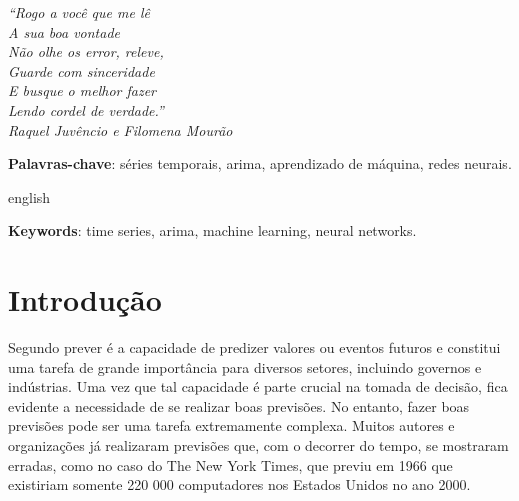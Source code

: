 \documentclass[
    12pt,
    oneside,
    a4paper,
    english,
    brazil
]{abntex2}
\begin{document}
\frenchspacing

\imprimircapa{}

\imprimirfolhaderosto{}

\begin{epigrafe}
    \vspace*{\fill}
    \begin{flushright}
        \textit{``Rogo a você que me lê\\
        A sua boa vontade\\
        Não olhe os error, releve,\\
        Guarde com sinceridade\\
        E busque o melhor fazer\\
        Lendo cordel de verdade.''\\
        Raquel Juvêncio e Filomena Mourão}
    \end{flushright}
\end{epigrafe}

\begin{resumo}

    \textbf{Palavras-chave}: séries temporais, arima, aprendizado de máquina,
    redes neurais.
\end{resumo}

\begin{resumo}[Abstract]
    \begin{otherlanguage*}{english}

        \textbf{Keywords}: time series, arima, machine learning, neural
        networks.
    \end{otherlanguage*}
\end{resumo}

\textual{}

\tableofcontents*
\cleardoublepage{}

\chapter{Introdução}


Segundo  prever é a capacidade de predizer valores ou eventos
futuros e  constitui uma  tarefa de grande  importância para  diversos setores,
incluindo governos e indústrias. Uma vez  que tal capacidade é parte crucial na
tomada de decisão,  fica evidente a necessidade de se  realizar boas previsões.
No entanto,  fazer boas  previsões pode ser  uma tarefa  extremamente complexa.
Muitos autores  e organizações já realizaram  previsões que, com o  decorrer do
tempo, se mostraram erradas, como no caso  do The New York Times, que previu em
1966  que existiriam  somente 220 000  computadores nos  Estados Unidos  no ano
2000.
\end{document}
